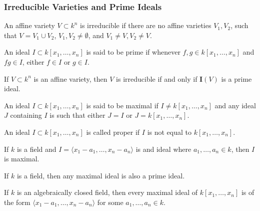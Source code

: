 \documentclass[crop=false,class=article,oneside]{standalone}
\begin{document}
        \subsubsection{Irreducible Varieties and Prime Ideals}
            \begin{definition}
                An affine variety $V\subset k^n$ is irreducible
                if there are no affine varieties $V_1, V_2$,
                such that $V = V_1\cup V_2$, $V_1,V_2\ne \emptyset$,
                and $V_1 \ne V, V_2 \ne V$.
            \end{definition}
            \begin{definition}
                An ideal $I\subset k[x_1,\hdots ,x_n]$ is
                said to be prime if whenever
                $f,g\in k[x_1,\hdots ,x_n]$ and $fg\in I$,
                either $f\in I$ or $g\in I$.
            \end{definition}
            \begin{theorem}
                If $V\subset k^n$ is an affine variety,
                then $V$ is irreducible if and only if
                $\textbf{I}(V)$ is a prime ideal.
            \end{theorem}
            \begin{definition}
                An ideal $I\subset k[x_1,\hdots ,x_n]$ is
                said to be maximal if $I \ne k[x_1,\hdots ,x_n]$
                and any ideal $J$ containing $I$ is such that
                either $J=I$ or $J=k[x_1,\hdots ,x_n]$.
            \end{definition}
            \begin{definition}
                An ideal $I\subset k[x_1,\hdots,x_n]$
                is called proper if $I$ is not equal to
                $k[x_1,\hdots ,x_n]$.
            \end{definition}
            \begin{theorem}
                If $k$ is a field and
                $I=\langle x_1-a_1,\hdots,x_n-a_n\rangle$
                is and ideal where $a_1,\hdots, a_n \in k$,
                then $I$ is maximal.
            \end{theorem}
            \begin{theorem}
                If $k$ is a field, then any maximal
                ideal is also a prime ideal.
            \end{theorem}
            \begin{theorem}
                If $k$ is an algebraically closed field,
                then every maximal ideal of $k[x_1,\hdots ,x_n]$
                is of the form
                $\langle x_1-a_1,\hdots, x_n-a_n\rangle$
                for some $a_1,\hdots, a_n\in k$.
            \end{theorem}
\end{document}
